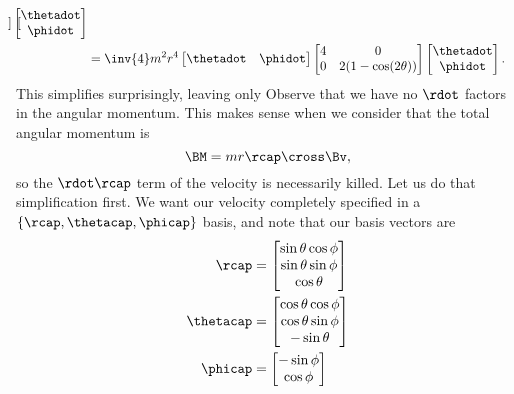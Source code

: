 {\begin{equation}
\begin{aligned}
\begin{bmatrix}
\end{bmatrix}
\begin{bmatrix}
\thetadot \\
\phidot
\end{bmatrix}  \\
&=
\inv{4} m^2 r^4
\begin{bmatrix}
\thetadot & \phidot
\end{bmatrix}
\begin{bmatrix}
4 & 0 \\
0 & 2(1 - \cos(2\theta))
\end{bmatrix}
\begin{bmatrix}
\thetadot \\
\phidot
\end{bmatrix}.
\end{aligned}
\end{equation}
%
This simplifies surprisingly, leaving only
%
%
%
Observe that we have no \(\rdot\) factors in the angular momentum.  This makes sense when we consider that the total angular momentum is
%
\begin{equation}\label{eqn:classicalMechanicsPs2:190}
\BM = m r \rcap \cross \Bv,
\end{equation}
%
so the \(\rdot \rcap\) term of the velocity is necessarily killed.  Let us do that simplification first.  We want our velocity completely specified in a \(\{\rcap, \thetacap, \phicap\}\) basis, and note that our basis vectors are
%
\begin{equation}\label{eqn:classicalMechanicsPs2:210}
\begin{aligned}
\rcap &=
\begin{bmatrix}
\sin\theta \cos\phi \\
\sin\theta \sin\phi \\
\cos\theta
\end{bmatrix} \\
\thetacap &=
\begin{bmatrix}
\cos\theta \cos\phi \\
\cos\theta \sin\phi \\
-\sin\theta
\end{bmatrix} \\
\phicap &=
\begin{bmatrix}
-\sin\phi \\
\cos\phi \\

\end{bmatrix}
\end{aligned}
\end{equation}}
